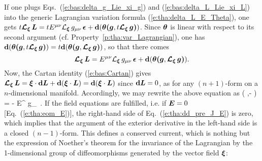 If one plugs Eqs.~(\ref{e:bas:delta_g_Lie_xi_g}) and (\ref{e:bas:delta_L_Lie_xi_L})
into the generic Lagrangian variation formula (\ref{e:tha:delta_L_E_Theta}), one gets
$t \bm{\mathcal{L}}_{\bm{\xi}}\, \bm{L}  = t E^{\mu\nu} {\mathcal{L}}_{\bm{\xi}}\, g_{\mu\nu} \,\bm{\epsilon} + \mathbf{d}( \bm{\theta}\textbf{(}\bm{g},t\bm{\mathcal{L}}_{\bm{\xi}}\,\bm{g}\textbf{)})$.
Since $\bm{\theta}$ is linear with respect to its second argument (cf. Property~\ref{p:tha:var_Lagrangian}),
one has
$\mathbf{d}( \bm{\theta}\textbf{(}\bm{g},t\bm{\mathcal{L}}_{\bm{\xi}}\,\bm{g}\textbf{)}) =  t \mathbf{d}( \bm{\theta}\textbf{(}\bm{g},\bm{\mathcal{L}}_{\bm{\xi}}\,\bm{g}\textbf{)})$, so that there comes
\[
    \bm{\mathcal{L}}_{\bm{\xi}}\, \bm{L}  = E^{\mu\nu} {\mathcal{L}}_{\bm{\xi}}\, g_{\mu\nu} \,\bm{\epsilon} + \mathbf{d}( \bm{\theta}\textbf{(}\bm{g},\bm{\mathcal{L}}_{\bm{\xi}}\,\bm{g}\textbf{)}) .
\]
Now, the Cartan identity (\ref{e:bas:Cartan}) gives
$\bm{\mathcal{L}}_{\bm{\xi}}\, \bm{L} = \bm{\xi} \cdot\mathbf{d} \bm{L} + \mathbf{d}(\bm{\xi}\cdot\bm{L}) = \mathbf{d}(\bm{\xi}\cdot\bm{L})$
since $\mathbf{d} \bm{L} = 0$, as for any $(n+1)$-form on a $n$-dimensional manifold.
Accordingly, we may rewrite the above equation as
\be \label{e:tha:dd_pre_J_E}
    \dd\left(  \w{\theta}\lld{},\Lie{\xi}\rld - \w{\xi}\cdot{} \right) =
    - E^{\mu\nu} \Liec{\xi} g_{\mu\nu} \,\weps .
\ee
If the field equations are fulfilled, i.e. if $\bm{E} = 0$ [Eq.~(\ref{e:tha:eom_E})], the
right-hand side of Eq.~(\ref{e:tha:dd_pre_J_E}) is zero, which implies that the
argument of the exterior derivative in the left-hand side is a closed
$(n-1)$-form. This defines a conserved current, which is nothing but the expression
of Noether's theorem for the invariance of the Lagrangian by the 1-dimensional
group of diffeomorphisms generated by the vector field $\bm{\xi}$:


